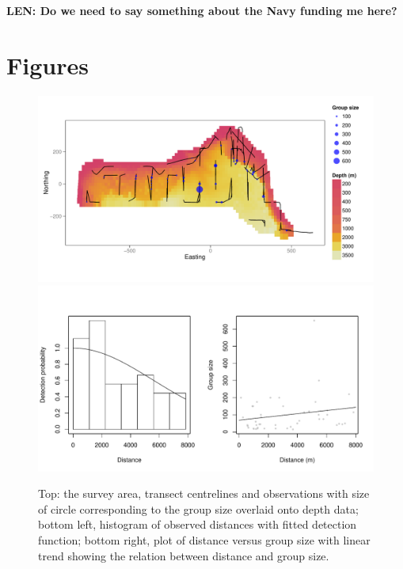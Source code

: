 \documentclass[a4paper,12pt]{article}
\begin{document}
\textbf{LEN: Do we need to say something about the Navy funding me here?}


\newpage



\newpage


\newpage


\section*{Figures}

\begin{figure}[h!]
  \caption{Top: the survey area, transect centrelines and observations with size of circle corresponding to the group size overlaid onto depth data; bottom left, histogram of observed distances with fitted detection function; bottom right, plot of distance versus group size with linear trend showing the relation between distance and group size.}
  \label{dolphin-eda}
  \begin{center}
    \includegraphics[width=\textwidth]{figs/depth-transects}\\
        \includegraphics[width=\textwidth]{figs/distances-groups}
  \end{center}
\end{figure}
\end{document}
